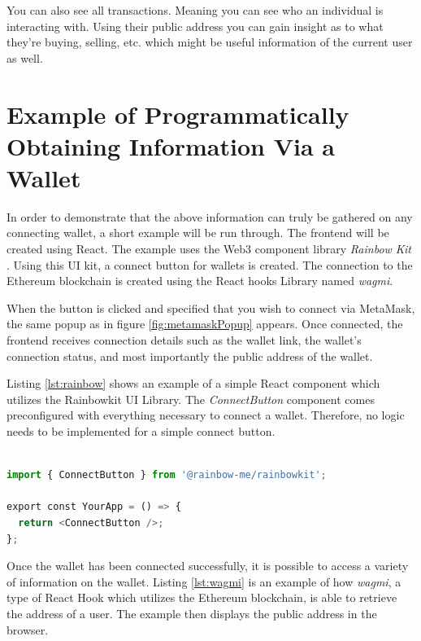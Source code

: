 You can also see all transactions. Meaning you can see who an individual is interacting with. Using their public address you can gain insight as to what they're buying, selling, etc. which might be useful information of the current user as well.

%
%
\section{Example of Programmatically Obtaining Information Via a Wallet}
\label{sec:methodology:code}
In order to demonstrate that the above information can truly be gathered on any connecting wallet, a short example will be run through. The frontend will be created using React. The example uses the Web3 component library \textit{Rainbow Kit} \cite{rainbowKit}. Using this UI kit, a connect button for wallets is created. The connection to the Ethereum blockchain is created using the React hooks Library named \textit{wagmi}.

When the button is clicked and specified that you wish to connect via MetaMask, the same popup as in figure \ref{fig:metamaskPopup} appears. Once connected, the frontend receives connection details such as the wallet link, the wallet's connection status, and most importantly the public address of the wallet.

Listing \ref{lst:rainbow} shows an example of a simple React component which utilizes the Rainbowkit UI Library. The \textit{ConnectButton} component comes preconfigured with everything necessary to connect a wallet. Therefore, no logic needs to be implemented for a simple connect button.

\begin{center}
\begin{lstlisting}[label=lst:rainbow ,language=python, caption=An example of implementing a connect wallet button within the frontend of a webapp using the \textit{RainbowKit} UI Library \cite{rainbowKit}., captionpos=b]

import { ConnectButton } from '@rainbow-me/rainbowkit';

export const YourApp = () => {
  return <ConnectButton />;
};

\end{lstlisting}
\end{center}

Once the wallet has been connected successfully, it is possible to access a variety of information on the wallet. Listing \ref{lst:wagmi} is an example of how \textit{wagmi}, a type of React Hook which utilizes the Ethereum blockchain, is able to retrieve the address of a user. The example then displays the public address in the browser.


